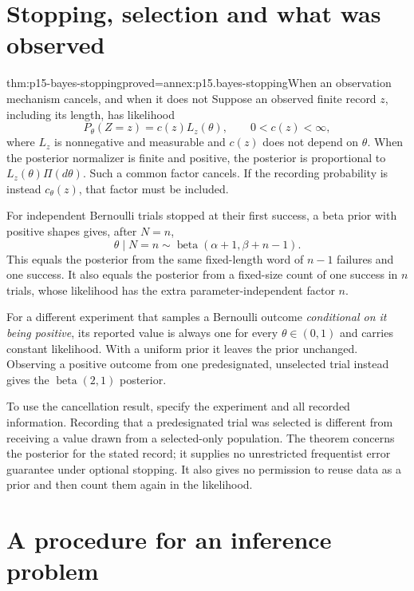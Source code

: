 \section{Stopping, selection and what was observed}
\label{sec:p15-bayes-stopping-selection}

\begin{hbtheorem}{thm:p15-bayes-stopping}{proved=annex:p15.bayes-stopping}{When an observation mechanism cancels, and when it does not}
Suppose an observed finite record \(z\), including its length, has
likelihood
\[
              P_\theta(Z=z)=c(z)L_z(\theta),
                  \qquad 0<c(z)<\infty ,
\]
where \(L_z\) is nonnegative and measurable and \(c(z)\) does not
depend on \(\theta\). When the posterior
normalizer is finite and positive, the posterior is proportional
to \(L_z(\theta)\Pi(d\theta)\). Such a common factor cancels.
If the recording probability is instead \(c_\theta(z)\),
that factor must be included.

For independent Bernoulli trials stopped at their first success,
a beta prior with positive shapes gives, after \(N=n\),
\[
                   \theta\mid N=n
                     \sim\operatorname{beta}(\alpha+1,\beta+n-1).
\]
This equals the posterior from the same fixed-length word of
\(n-1\) failures and one success. It also equals the posterior
from a fixed-size count of one success in \(n\) trials, whose
likelihood has the extra parameter-independent factor \(n\).

For a different experiment that samples a Bernoulli outcome
\emph{conditional on it being positive}, its reported value is
always one for every \(\theta\in(0,1)\) and carries constant
likelihood. With a uniform prior it leaves the prior unchanged.
Observing a positive outcome from one predesignated, unselected
trial instead gives the \(\operatorname{beta}(2,1)\) posterior.
\end{hbtheorem}

To use the cancellation result, specify the experiment and all recorded
information. Recording that a predesignated trial was selected is
different from receiving a value drawn from a selected-only population.
The theorem concerns the posterior for the stated record; it supplies
no unrestricted frequentist error guarantee under optional stopping.
It also gives no permission to reuse data as a prior and then count
them again in the likelihood.

\section{A procedure for an inference problem}
\label{sec:p15-bayes-reference-procedure}

